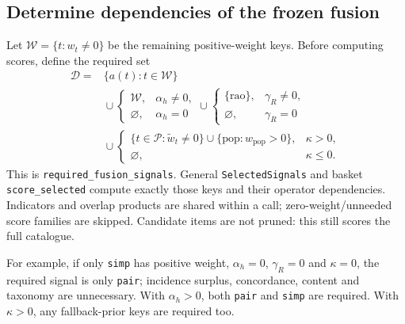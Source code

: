 \documentclass[11pt,a4paper]{article}
\newcommand{\code}[1]{\nolinkurl{#1}}
\newcommand{\sig}[1]{\mathrm{#1}}
\numberwithin{equation}{section}
\begin{document}
\subsection{Determine dependencies of the frozen fusion}
Let $\mathcal W=\{t:w_t\ne0\}$ be the remaining positive-weight keys. Before computing
scores, define the required set
\begin{align}
 \mathcal D={}&\{a(t):t\in\mathcal W\}\\
 &{}\cup\begin{cases}\mathcal W,&\alpha_h\ne0,\\\varnothing,&\alpha_h=0\end{cases}
 \cup\begin{cases}\{\sig{rao}\},&\gamma_R\ne0,\\\varnothing,&\gamma_R=0\end{cases}\nonumber\\
 &{}\cup\begin{cases}
 \{t\in\mathcal P:\widetilde w_t\ne0\}
 \cup\{\sig{pop}:w_{\sig{pop}}>0\},&\kappa>0,\\
 \varnothing,&\kappa\le0.
 \end{cases}\nonumber
\end{align}
This is \code{required_fusion_signals}. General \code{SelectedSignals} and basket
\code{score_selected} compute exactly those keys and their operator dependencies.
Indicators and overlap products are shared within a call; zero-weight/unneeded score
families are skipped. Candidate items are not pruned: this still scores the full catalogue.

For example, if only \code{simp} has positive weight, $\alpha_h=0$, $\gamma_R=0$ and
$\kappa=0$, the required signal is only \code{pair}; incidence surplus, concordance,
content and taxonomy are unnecessary. With $\alpha_h>0$, both \code{pair} and
\code{simp} are required. With $\kappa>0$, any fallback-prior keys are required too.
\end{document}
